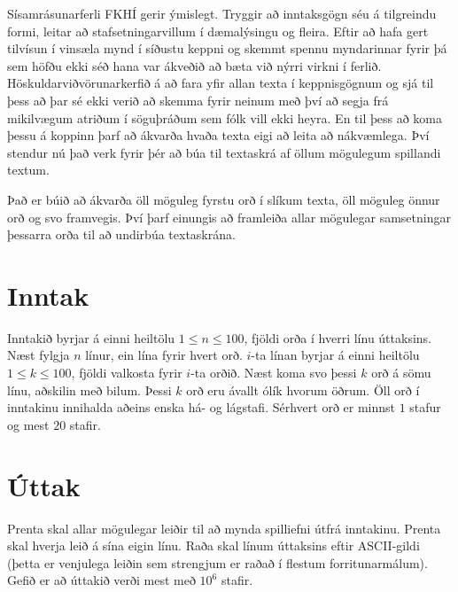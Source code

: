 
Sísamrásunarferli FKHÍ gerir ýmislegt. 
Tryggir að inntaksgögn séu á tilgreindu formi, 
leitar að stafsetningarvillum í dæmalýsingu og fleira.
Eftir að hafa gert tilvísun í vinsæla mynd í síðustu keppni
og skemmt spennu myndarinnar fyrir þá sem höfðu ekki séð hana
var ákveðið að bæta við nýrri virkni í ferlið.
Höskuldarviðvörunarkerfið á að fara yfir allan texta í 
keppnisgögnum og sjá til þess að þar sé ekki verið að skemma
fyrir neinum með því að segja frá mikilvægum atriðum í 
söguþráðum sem fólk vill ekki heyra.
En til þess að koma þessu á koppinn þarf að ákvarða hvaða
texta eigi að leita að nákvæmlega.
Því stendur nú það verk fyrir þér að búa til textaskrá
af öllum mögulegum spillandi textum.

Það er búið að ákvarða öll möguleg fyrstu orð í slíkum texta,
öll möguleg önnur orð og svo framvegis.
Því þarf einungis að framleiða allar mögulegar samsetningar
þessarra orða til að undirbúa textaskrána.

\section*{Inntak}

Inntakið byrjar á einni heiltölu $1 \leq n \leq 100$,
fjöldi orða í hverri línu úttaksins.
Næst fylgja $n$ línur, ein lína fyrir hvert orð.
$i$-ta línan byrjar á einni heiltölu $1 \leq k \leq 100$,
fjöldi valkosta fyrir $i$-ta orðið.
Næst koma svo þessi $k$ orð á sömu línu, aðskilin með bilum.
Þessi $k$ orð eru ávallt ólík hvorum öðrum.
Öll orð í inntakinu innihalda aðeins enska há- og lágstafi.
Sérhvert orð er minnst $1$ stafur og mest $20$ stafir.

\section*{Úttak}

Prenta skal allar mögulegar leiðir til að mynda spilliefni
útfrá inntakinu. Prenta skal hverja leið á sína eigin línu.
Raða skal línum úttaksins eftir ASCII-gildi (þetta er
venjulega leiðin sem strengjum er raðað í flestum
forritunarmálum).
Gefið er að úttakið verði mest með $10^6$ stafir.
